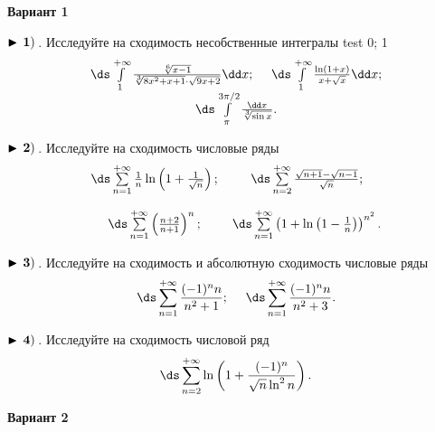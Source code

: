 
\centerline{\bf\Large Вариант 1}


$\bf\blacktriangleright\,1)\,$. Исследуйте на сходимость несобственные интегралы test 0; 1
\begin{equation*}
\begin{array}{cc}
  \,
\ds\int\limits_{1}^{+\infty} \frac{\sqrt[6]{x-1}}{\sqrt[3]{8x^2+x+1}\cdot \sqrt{9x+2}}\dd x

  ;\quad\,    \,
\ds\int\limits_{1}^{+\infty}\frac{\ln(1+x)}{x+\sqrt{x}}\dd x

  ;\\
  \,
\ds\int\limits_{\pi}^{3\pi/2}\frac{\dd x}{\sqrt[3]{\sin x}}

  .
\end{array}
\end{equation*}


$\bf\blacktriangleright\,2)\,$. Исследуйте на сходимость числовые ряды
\begin{equation*}
    \begin{array}{ccc}
        \,
\ds\sum\limits_{n=1}^{+\infty}\frac{1}{n}\ln\left(1+\frac{1}{\sqrt{n}}\right)

        ; &   \,
\ds\sum\limits_{n=2}^{+\infty}\frac{\sqrt{n+1}-\sqrt{n-1}}{\sqrt{n}}

        ; \\[6mm]
        \,
\ds\sum\limits_{n=1}^{+\infty}\left(\frac{n+2}{n+1}\right)^{n}

        ; &    \,
\ds\sum\limits_{n=1}^{+\infty}\left(1+\ln\left(1-\frac{1}{n}\right)\right)^{n^2}

        .
    \end{array}
\end{equation*}


$\bf\blacktriangleright\,3)\,$. Исследуйте на сходимость и абсолютную сходимость числовые ряды
\begin{equation*}
    \,\ds\sum\limits_{n=1}^{+\infty}\frac{(-1)^n n}{n^2+1}

    ;\quad\,   \,
\ds\sum\limits_{n=1}^{+\infty}\frac{(-1)^n n}{n^2+3}
    .
\end{equation*}


$\bf\blacktriangleright\,4)\,$. Исследуйте на сходимость числовой ряд
\begin{equation*}
    \,
\ds\sum\limits_{n=2}^{+\infty}\ln\left(1+\frac{(-1)^n}{\sqrt{n}\ln^2 n}\right)

    .
\end{equation*}

\centerline{\bf\Large Вариант 2}



